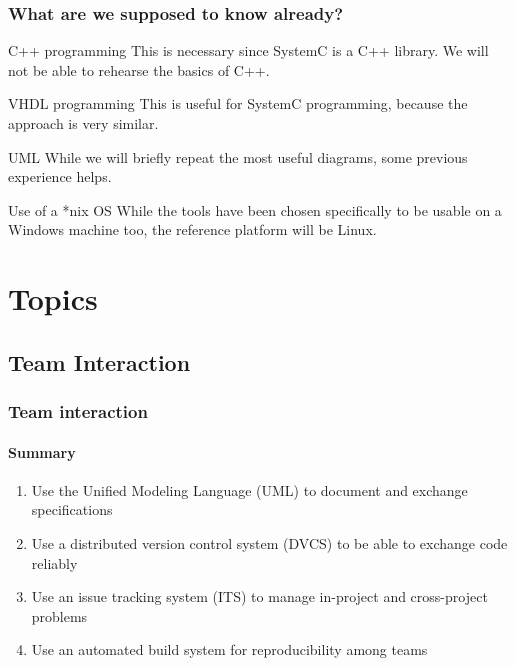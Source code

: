 \begin{frame}
\frametitle{What are we supposed to know already?}

\begin{block}{C++ programming}
This is necessary since SystemC is a C++ library. We will not be able to rehearse the basics of C++.
\end{block}
\begin{block}{VHDL programming}
This is useful for SystemC programming, because the approach is very similar.
\end{block}
\begin{block}{UML}
While we will briefly repeat the most useful diagrams, some previous experience helps.
\end{block}
\begin{block}{Use of a *nix OS}
While the tools have been chosen specifically to be usable on a Windows machine too, the reference platform will be Linux.
\end{block}

\end{frame}

\section{Topics}

\subsection{Team Interaction}

\begin{frame}
\frametitle{Team interaction}
\framesubtitle{Summary}
\begin{enumerate}
\item Use the Unified Modeling Language (UML) to document and exchange specifications
\item Use a distributed version control system (DVCS) to be able to exchange code reliably
\item Use an issue tracking system (ITS) to manage in-project and cross-project problems
\item Use an automated build system for reproducibility among teams
\end{enumerate}
\end{frame}

